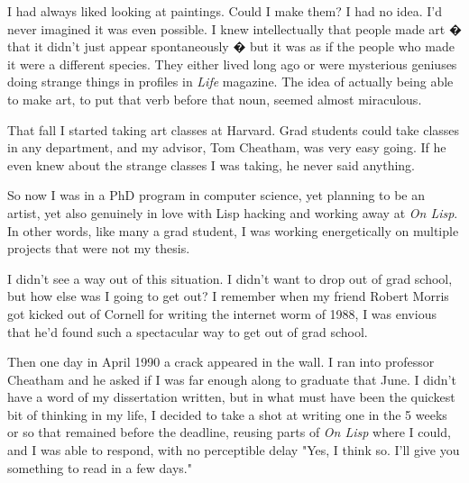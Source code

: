I had
                  always liked looking at paintings. Could I make them? I had no
                  idea. I'd never imagined it was even possible. I knew
                  intellectually that people made art � that it didn't just
                  appear spontaneously � but it was as if the people who made it
                  were a different species. They either lived long ago or were
                  mysterious geniuses doing strange things in profiles in
                  \emph{Life} magazine. The idea of actually being able to make
                  art, to put that verb before that noun, seemed almost
                  miraculous.

That fall I started taking art classes
                  at Harvard. Grad students could take classes in any
                  department, and my advisor, Tom Cheatham, was very easy going.
                  If he even knew about the strange classes I was taking, he
                  never said anything.

So now I was in a PhD program
                  in computer science, yet planning to be an artist, yet also
                  genuinely in love with Lisp hacking and working away at
                  \emph{On Lisp}. In other words, like many a grad student, I
                  was working energetically on multiple projects that were not
                  my thesis.

I didn't see a way out of this
                  situation. I didn't want to drop out of grad school, but how
                  else was I going to get out? I remember when my friend Robert
                  Morris got kicked out of Cornell for writing the internet worm
                  of 1988, I was envious that he'd found such a spectacular way
                  to get out of grad school.

Then one day in April
                  1990 a crack appeared in the wall. I ran into professor
                  Cheatham and he asked if I was far enough along to graduate
                  that June. I didn't have a word of my dissertation written,
                  but in what must have been the quickest bit of thinking in my
                  life, I decided to take a shot at writing one in the 5 weeks
                  or so that remained before the deadline, reusing parts of
                  \emph{On Lisp} where I could, and I was able to respond, with
                  no perceptible delay "Yes, I think so. I'll give you something
                  to read in a few days."

